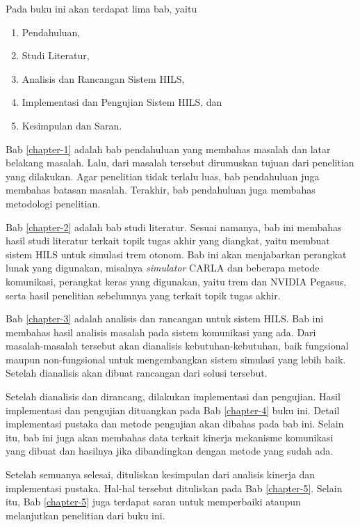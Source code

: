 
Pada buku ini akan terdapat lima bab, yaitu
\begin{enumerate}
	\item Pendahuluan,
	\item Studi Literatur,
	\item Analisis dan Rancangan Sistem HILS,
	\item Implementasi dan Pengujian Sistem HILS, dan
	\item Kesimpulan dan Saran.
\end{enumerate}

Bab \ref{chapter-1} adalah bab pendahuluan yang membahas masalah dan latar belakang
masalah. Lalu, dari masalah tersebut dirumuskan tujuan dari penelitian yang
dilakukan. Agar penelitian tidak terlalu luas, bab pendahuluan juga membahas
batasan masalah. Terakhir, bab pendahuluan juga membahas metodologi penelitian.

Bab \ref{chapter-2} adalah bab studi literatur. Sesuai namanya, bab ini membahas
hasil studi literatur terkait topik tugas akhir yang diangkat, yaitu membuat
sistem HILS untuk simulasi trem otonom. Bab ini akan menjabarkan perangkat lunak
yang digunakan, misalnya \textit{simulator} CARLA dan beberapa metode
komunikasi, perangkat keras yang digunakan, yaitu trem dan NVIDIA Pegasus, serta
hasil penelitian sebelumnya yang terkait topik tugas akhir.

Bab \ref{chapter-3} adalah analisis dan rancangan untuk sistem HILS. Bab ini
membahas hasil analisis masalah pada sistem komunikasi yang ada. Dari
masalah-masalah tersebut akan dianalisis kebutuhan-kebutuhan, baik fungsional
maupun non-fungsional untuk mengembangkan sistem simulasi yang lebih baik.
Setelah dianalisis akan dibuat rancangan dari solusi tersebut.

Setelah dianalisis dan dirancang, dilakukan implementasi dan pengujian. Hasil
implementasi dan pengujian dituangkan pada Bab \ref{chapter-4} buku ini. Detail
implementasi pustaka dan metode pengujian akan dibahas pada bab ini. Selain itu,
bab ini juga akan membahas data terkait kinerja mekanisme komunikasi
yang dibuat dan hasilnya jika dibandingkan dengan metode yang sudah ada.

Setelah semuanya selesai, dituliskan kesimpulan dari analisis kinerja dan
implementasi pustaka. Hal-hal tersebut dituliskan pada Bab \ref{chapter-5}.
Selain itu, Bab \ref{chapter-5} juga terdapat saran untuk memperbaiki ataupun
melanjutkan penelitian dari buku ini.
